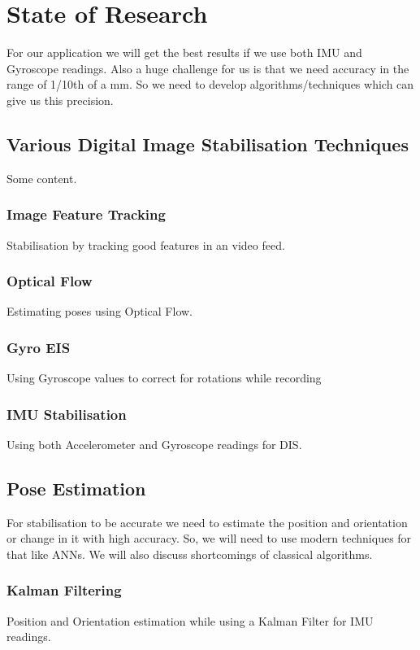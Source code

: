 \chapter{State of Research} \label{chapter_three}

For our application we will get the best results if we use both IMU and Gyroscope readings. 
Also a huge challenge for us is that we need accuracy in the range of 1/10th of a mm. So we need to develop algorithms/techniques which can give us this precision.

\section{Various Digital Image Stabilisation Techniques}

Some content.
\subsection{Image Feature Tracking}
Stabilisation by tracking good features in an video feed.

\subsection{Optical Flow}
Estimating poses using Optical Flow.

\subsection{Gyro EIS}
Using Gyroscope values to correct for rotations while recording

\subsection{IMU Stabilisation}
Using both Accelerometer and Gyroscope readings for DIS.

\section{Pose Estimation}
For stabilisation to be accurate we need to estimate the position and orientation or change in it with high accuracy. So, we will need to use modern techniques for that like ANNs. We will also discuss shortcomings of classical algorithms.

\subsection{Kalman Filtering}
Position and Orientation estimation while using a Kalman Filter for IMU readings.

